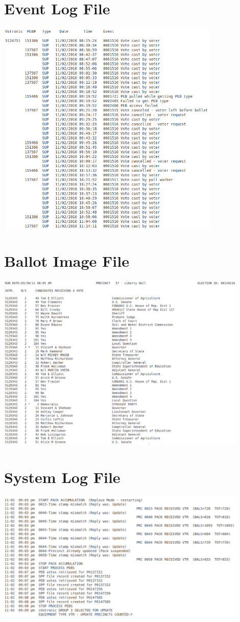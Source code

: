 \clearpage
\onecolumn
\begin{center}
\appendix
\section{Event Log File}\label{app:el} 
\includegraphics[width=0.8\textwidth]{eventLog}

\clearpage
\section{Ballot Image File}\label{app:bi}
\includegraphics[width=0.9\textwidth]{ballot}

\clearpage
\section{System Log File}\label{app:sl}
\includegraphics[width=0.9\textwidth]{system}
\end{center}
